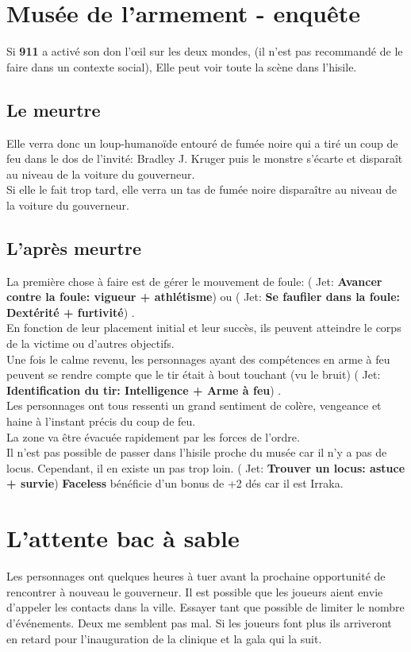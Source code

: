 \documentclass[oneside,12pt]{book}
\newcommand\roll[1]{
( Jet: \textbf{#1})
}
\newcommand{\Andy}{\textbf{Faceless} }
\newcommand{\Kelly}{\textbf{911} }
\begin{document}
\begin{flushleft}
\section{Musée de l’armement - enquête}
Si \Kelly a activé son don l’œil sur les deux mondes, (il n’est pas recommandé de le faire dans un contexte social), Elle peut voir toute la scène dans l’hisile. 
\subsection{Le meurtre}
\label{meurtre}
Elle verra donc un loup-humanoïde entouré de fumée noire qui a tiré un coup de feu dans le dos de l’invité: Bradley J. Kruger puis le monstre s’écarte et disparaît au niveau de la voiture du gouverneur.\\
Si elle le fait trop tard, elle verra un tas de fumée noire disparaître au niveau de la voiture du gouverneur.\\
\subsection{L’après meurtre}
La première chose à faire est de gérer le mouvement de foule: \roll{Avancer contre la foule: vigueur + athlétisme} ou \roll{Se faufiler dans la foule: Dextérité + furtivité}.\\
En fonction de leur placement initial et leur succès, ils peuvent atteindre le corps de la victime ou d’autres objectifs. \\
Une fois le calme revenu, les personnages ayant des compétences en arme à feu peuvent se rendre compte que le tir était à bout touchant (vu le bruit) \roll{Identification du tir: Intelligence + Arme à feu}.\\
Les personnages ont tous ressenti un grand sentiment de colère, vengeance et haine à l’instant précis du coup de feu.\\

La zone va être évacuée rapidement par les forces de l’ordre.\\ Il n’est pas possible de passer dans l’hisile proche du musée car il n’y a pas de locus. Cependant, il en existe un pas trop loin. \roll{Trouver un locus: astuce + survie} \Andy bénéficie d’un bonus de +2 dés car il est Irraka. \\

\section{L’attente bac à sable}
Les personnages ont quelques heures à tuer avant la prochaine opportunité de rencontrer à nouveau le gouverneur. Il est possible que les joueurs aient envie d’appeler les contacts dans la ville.
Essayer tant que possible de limiter le nombre d’événements. Deux me semblent pas mal. Si les joueurs font plus ils arriveront en retard pour l’inauguration de la clinique et la gala qui la suit.


\end{flushleft}
\end{document}
